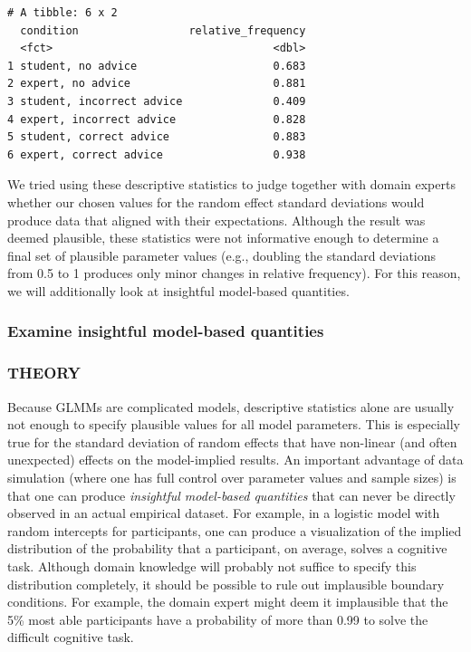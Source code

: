 \documentclass[
  man,
  floatsintext,
  longtable,
  a4paper,
  nolmodern,
  notxfonts,
  notimes,
  colorlinks=true,linkcolor=blue,citecolor=blue,urlcolor=blue]{apa7}
\begin{document}
\begin{verbatim}
# A tibble: 6 x 2
  condition                 relative_frequency
  <fct>                                  <dbl>
1 student, no advice                     0.683
2 expert, no advice                      0.881
3 student, incorrect advice              0.409
4 expert, incorrect advice               0.828
5 student, correct advice                0.883
6 expert, correct advice                 0.938
\end{verbatim}

We tried using these descriptive statistics to judge together with
domain experts whether our chosen values for the random effect standard
deviations would produce data that aligned with their expectations.
Although the result was deemed plausible, these statistics were not
informative enough to determine a final set of plausible parameter
values (e.g., doubling the standard deviations from 0.5 to 1 produces
only minor changes in relative frequency). For this reason, we will
additionally look at insightful model-based quantities.

\subsubsection{Examine insightful model-based
quantities}\label{examine-insightful-model-based-quantities}

\subsubsection{THEORY}\label{theory-4}

Because GLMMs are complicated models, descriptive statistics alone are
usually not enough to specify plausible values for all model parameters.
This is especially true for the standard deviation of random effects
that have non-linear (and often unexpected) effects on the model-implied
results. An important advantage of data simulation (where one has full
control over parameter values and sample sizes) is that one can produce
\emph{insightful model-based quantities} that can never be directly
observed in an actual empirical dataset. For example, in a logistic
model with random intercepts for participants, one can produce a
visualization of the implied distribution of the probability that a
participant, on average, solves a cognitive task. Although domain
knowledge will probably not suffice to specify this distribution
completely, it should be possible to rule out implausible boundary
conditions. For example, the domain expert might deem it implausible
that the 5\% most able participants have a probability of more than 0.99
to solve the difficult cognitive task.
\end{document}
